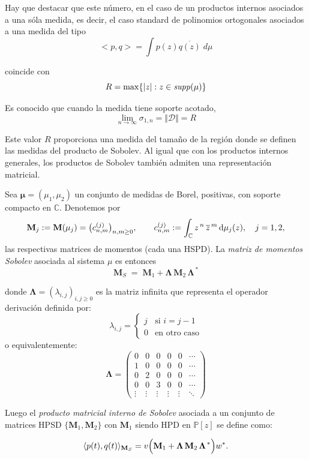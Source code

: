 \noindent Hay que destacar que este número, en el caso de un productos internos asociados a una sóla medida, es decir, el caso standard de polinomios ortogonales asociados a una medida del tipo
$$
	<p,q>=\int p(z) \overline{q(z)} \; d\mu
$$

\noindent
coincide con
$$
	R=\max \{ \vert z \vert : z\in {\it supp}(\mu)\}
$$

\noindent Es conocido que cuando la medida tiene soporte acotado,
$$\lim_{n\to \infty} \sigma_{1,n} = \Vert \mathcal{D}\Vert = R$$


Este valor $R$ proporciona una medida del tamaño de la región donde se definen las medidas del producto de Sobolev. Al igual que con los productos internos generales, los productos de Sobolev también admiten una representación matricial.

\begin{definition}\label{def:sobolev_matrix}
	\cite{escribano2025boundedness}
	Sea $\boldsymbol{\mu}=(\mu_{1},\mu_{2})$ un conjunto de medidas de Borel,
	positivas, con soporte compacto en $\mathbb{C}$.
	Denotemos por
	\[
		\textbf{M}_j:=\textbf{M}(\mu_j)=\bigl(c^{(j)}_{n,m}\bigr)_{n,m\ge0},
		\qquad
		c^{(j)}_{n,m}:=\int_{\mathbb C} z^{\,n}\,\overline{z}^{\,m}\,{\rm d}\mu_j(z),
		\quad j=1,2,
	\]
	las respectivas matrices de momentos (cada una HSPD).
	\vspace{0.4em}
	La \emph{matriz de momentos Sobolev}
	asociada al sistema \(\mu\) es entonces
	\[
		\textbf{M}_S \;=\;
		\textbf{M}_1 + \boldsymbol{\Lambda}\,\textbf{M}_2\,
		\boldsymbol{\Lambda}^{\,*}
	\]

	donde $\boldsymbol{\Lambda} = (\lambda_{i,j})_{i,j\ge0}$ es la matriz infinita que representa el operador derivación definida por:
	\[
		\lambda_{i,j} = \begin{cases}
			j & \text{si } i = j-1  \\
			0 & \text{en otro caso}
		\end{cases}
	\]
	o equivalentemente:
	\[
		\boldsymbol{\Lambda} = \begin{pmatrix}
			0      & 0      & 0      & 0      & 0      & \cdots \\
			1      & 0      & 0      & 0      & 0      & \cdots \\
			0      & 2      & 0      & 0      & 0      & \cdots \\
			0      & 0      & 3      & 0      & 0      & \cdots \\
			\vdots & \vdots & \vdots & \vdots & \vdots & \ddots
		\end{pmatrix}
	\]

	Luego el \emph{producto matricial interno de Sobolev} asociada a un conjunto de matrices HPSD \(\{\textbf{M}_1,\textbf{M}_2\}\) con $\textbf{M}_1$ siendo HPD en $\mathbb{P}[z]$ se define como:

	$$
		\langle p(t), q(t) \rangle_{\textbf{M}_{S}} = v \Bigl( \textbf{M}_1 + \boldsymbol{\Lambda}\,\textbf{M}_2\,
		\boldsymbol{\Lambda}^{\,*}\Bigr) w^{*}.
	$$
\end{definition}

